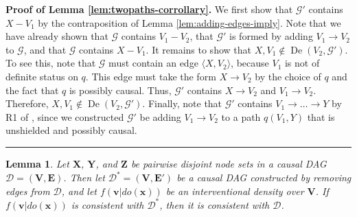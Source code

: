 \documentclass[11pt]{article}
\DeclareMathOperator{\De}{De}
\newcommand{\BlackBox}{\rule{1.5ex}{1.5ex}}  %
\newtheorem{lemma}[theorem]{Lemma}
\newcommand{\mb}[1]{\mathbf{#1}}
\newcommand{\g}[1][G]{\mathcal{#1}}
\newenvironment{proofof}[1][]{\noindent \textbf{Proof of #1.}}{\hfill\BlackBox}
\begin{document}
\begin{proofof}[Lemma \ref{lem:twopaths-corrollary}]
    We first show that $\g'$ contains $X - V_1$ by the contraposition of Lemma \ref{lem:adding-edges-imply}. Note that we have already shown that $\g$ contains $V_1 - V_2$, that $\g'$ is formed by adding $V_1 \to V_2$ to $\g$, and that $\g$ contains $X - V_1$. It remains to show that $X,V_1 \notin \De(V_2, \g')$. To see this, note that $\g$ must contain an edge $\langle X,V_2 \rangle$, because $V_1$ is not of definite status on $q$. This edge must take the form $X \to V_2$ by the choice of $q$ and the fact that $q$ is possibly causal. Thus, $\g'$ contains $X \to V_2$ and $V_1 \to V_2$. Therefore, $X,V_1 \notin \De(V_2, \g')$. Finally, note that $\g'$ contains $V_1 \to \dots \to Y$ by R1 of \cite{meek1995causal}, since we constructed $\g'$ be adding $V_1 \to V_2$ to a path $q(V_1,Y)$ that is unshielded and possibly causal.
\end{proofof}


\begin{lemma}
\label{lem:markov-sub}
    Let $\mb{X}$, $\mb{Y}$, and $\mb{Z}$ be pairwise disjoint node sets in a causal DAG $\g[D] = (\mb{V},\mb{E})$. Then let $\g[D]^* = (\mb{V},\mb{E'})$ be a causal DAG constructed by removing edges from $\g[D]$, and let $f(\mb{v} | do(\mb{x}))$ be an interventional density over $\mb{V}$. If $f(\mb{v} | do(\mb{x}))$ is consistent with $\g[D]^*$, then it is consistent with $\g[D]$.
\end{lemma}
\end{document}
